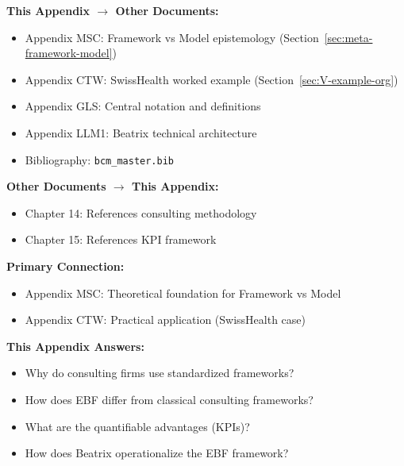 
\begin{tcolorbox}[colback=gray!5!white, colframe=gray!75!black,
    title=\textbf{Cross-Reference Map}]

\textbf{This Appendix $\rightarrow$ Other Documents:}
\begin{itemize}[nosep]
    \item Appendix MSC: Framework vs Model epistemology (Section~\ref{sec:meta-framework-model})
    \item Appendix CTW: SwissHealth worked example (Section~\ref{sec:V-example-org})
    \item Appendix GLS: Central notation and definitions
    \item Appendix LLM1: Beatrix technical architecture
    \item Bibliography: \texttt{bcm\_master.bib}
\end{itemize}

\textbf{Other Documents $\rightarrow$ This Appendix:}
\begin{itemize}[nosep]
    \item Chapter 14: References consulting methodology
    \item Chapter 15: References KPI framework
\end{itemize}

\end{tcolorbox}

\begin{tcolorbox}[colback=purple!5!white, colframe=purple!75!black,
    title=Chapter Linkage]

\textbf{Primary Connection:}
\begin{itemize}[nosep]
\item Appendix MSC: Theoretical foundation for Framework vs Model
\item Appendix CTW: Practical application (SwissHealth case)
\end{itemize}

\textbf{This Appendix Answers:}
\begin{itemize}[nosep]
\item Why do consulting firms use standardized frameworks?
\item How does EBF differ from classical consulting frameworks?
\item What are the quantifiable advantages (KPIs)?
\item How does Beatrix operationalize the EBF framework?
\end{itemize}

\end{tcolorbox}

